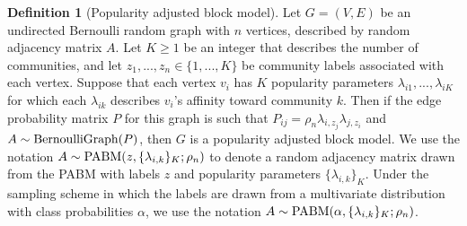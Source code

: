 \documentclass[
  12pt,
]{article}
\theoremstyle{definition}
\newtheorem{definition}{Definition}[section]
\theoremstyle{definition}
\theoremstyle{definition}
\theoremstyle{definition}
\theoremstyle{remark}
\begin{document}
\begin{definition}[Popularity adjusted block model]
\label{def:pabm}
Let $G = (V, E)$ be an undirected Bernoulli random graph with $n$ vertices, described by random adjacency matrix $A$. 
Let $K \geq 1$ be an integer that describes the number of communities, and let 
$z_1, ..., z_n \in \{1, ..., K\}$ be community labels associated with each vertex. 
Suppose that each vertex $v_i$ has $K$ popularity parameters $\lambda_{i1}, ..., \lambda_{iK}$ for which each $\lambda_{ik}$ describes $v_i$'s affinity toward community $k$. 
Then if the edge probability matrix $P$ for this graph is such that $P_{ij} = \rho_n \lambda_{i, z_j} \lambda_{j, z_i}$ and $A \sim \mathrm{BernoulliGraph}(P)$, then $G$ is a popularity adjusted block model.
We use the notation $A \sim \mathrm{PABM}(z, \{\lambda_{i, k}\}_K; \rho_n)$ to denote a random adjacency matrix drawn from the PABM with labels $z$ and popularity parameters $\{\lambda_{i, k}\}_K$. 
Under the sampling scheme in which the labels are drawn from a multivariate distribution with class probabilities $\alpha$, we use the notation $A \sim \mathrm{PABM}(\alpha, \{\lambda_{i, k}\}_K; \rho_n)$. 
\end{definition}
\end{document}
